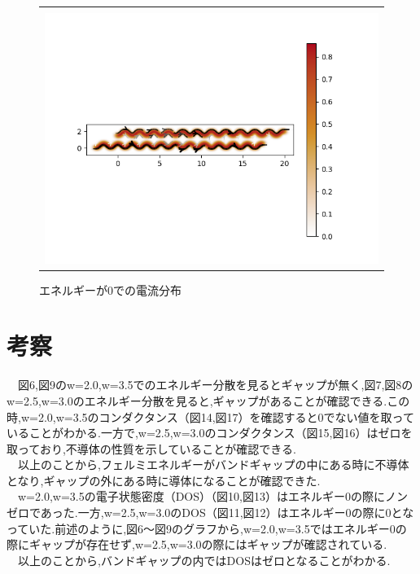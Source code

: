 \begin{figure}[htpb]
\begin{tabular}{c}
    \\
    \\

    \begin{minipage}{0.50\hsize}
    \centering
    \includegraphics[keepaspectratio, scale=0.55]{./data/w2/w2-j_zero.png}
    \caption{エネルギーが0での電流分布}
    \label{j:z}
    \end{minipage}
  \end{tabular}
\end{figure}


\newpage

\section{考察}
　図6,図9のw=2.0,w=3.5でのエネルギー分散を見るとギャップが無く,図7,図8のw=2.5,w=3.0のエネルギー分散を見ると,ギャップがあることが確認できる.この時,w=2.0,w=3.5のコンダクタンス（図14,図17）を確認すると0でない値を取っていることがわかる.一方で,w=2.5,w=3.0のコンダクタンス（図15,図16）はゼロを取っており,不導体の性質を示していることが確認できる.\\
　以上のことから,フェルミエネルギーがバンドギャップの中にある時に不導体となり,ギャップの外にある時に導体になることが確認できた.\\

　w=2.0,w=3.5の電子状態密度（DOS）（図10,図13）はエネルギー0の際にノンゼロであった.一方,w=2.5,w=3.0のDOS（図11,図12）はエネルギー0の際に0となっていた.前述のように,図6〜図9のグラフから,w=2.0,w=3.5ではエネルギー0の際にギャップが存在せず,w=2.5,w=3.0の際にはギャップが確認されている.\\
　以上のことから,バンドギャップの内ではDOSはゼロとなることがわかる.\\

